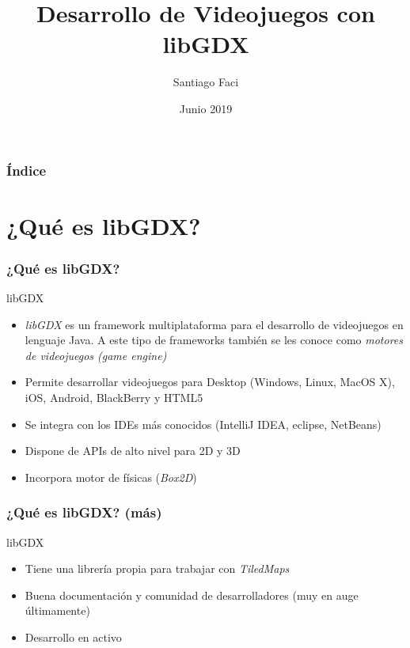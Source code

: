 \documentclass[xcolor={dvipsnames}]{beamer}
\begin{document}
\title{Desarrollo de Videojuegos con libGDX}
\author{Santiago Faci}
\date{Junio 2019} 

\begin{frame}
\titlepage
\end{frame}

\begin{frame}[plain]\frametitle{Índice}\tableofcontents
\end{frame} 


\section{¿Qué es libGDX?} 
\begin{frame}\frametitle{¿Qué es libGDX?} 
    \begin{block}{libGDX}
    \begin{itemize}
        \item \emph{\textcolor{resalta}{libGDX}} es un framework multiplataforma para el desarrollo de videojuegos en lenguaje Java. A este tipo de frameworks también se les conoce como \emph{motores de videojuegos (game engine)}
        \item Permite desarrollar videojuegos para Desktop (Windows, Linux, MacOS X), iOS, Android, BlackBerry y HTML5
        \item Se integra con los IDEs más conocidos (IntelliJ IDEA, eclipse, NetBeans)
        \item Dispone de APIs de alto nivel para 2D y 3D
        \item Incorpora motor de físicas (\emph{\textcolor{resalta}{Box2D}})
    \end{itemize}
    \end{block}
\end{frame}

\begin{frame}\frametitle{¿Qué es libGDX? (más)}
	\begin{block}{libGDX}
    \begin{itemize}
		\item Tiene una librería propia para trabajar con \emph{TiledMaps}
		\item Buena documentación y comunidad de desarrolladores (muy en auge últimamente)
		\item Desarrollo en activo \href{http://libgdx.badlogicgames.com}{}
    \end{itemize}
    \end{block}
\end{frame}
\end{document}
